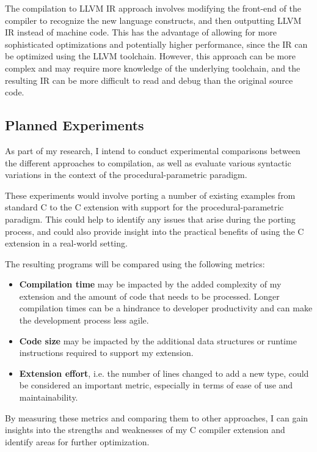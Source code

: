 \documentclass[conference]{IEEEtran}
\begin{document}
The compilation to LLVM IR approach involves modifying the front-end of the compiler to recognize the new language constructs, and then outputting LLVM IR instead of machine code.
This has the advantage of allowing for more sophisticated optimizations and potentially higher performance, since the IR can be optimized using the LLVM toolchain.
However, this approach can be more complex and may require more knowledge of the underlying toolchain, and the resulting IR can be more difficult to read and debug than the original source code.

\subsection{Planned Experiments}
As part of my research, I intend to conduct experimental comparisons between the different approaches to compilation, as well as evaluate various syntactic variations in the context of the procedural-parametric paradigm.

These experiments would involve porting a number of existing examples from standard C to the C extension with support for the procedural-parametric paradigm.
This could help to identify any issues that arise during the porting process, and could also provide insight into the practical benefits of using the C extension in a real-world setting.

The resulting programs will be compared using the following metrics:
\begin{itemize}
  \item \textbf{Compilation time} may be impacted by the added complexity of my extension and the amount of code that needs to be processed. Longer compilation times can be a hindrance to developer productivity and can make the development process less agile.
  \item \textbf{Code size} may be impacted by the additional data structures or runtime instructions required to support my extension.
  \item \textbf{Extension effort}, i.e. the number of lines changed to add a new type, could be considered an important metric, especially in terms of ease of use and maintainability.
\end{itemize}

By measuring these metrics and comparing them to other approaches, I can gain insights into the strengths and weaknesses of my C compiler extension and identify areas for further optimization.
\end{document}
